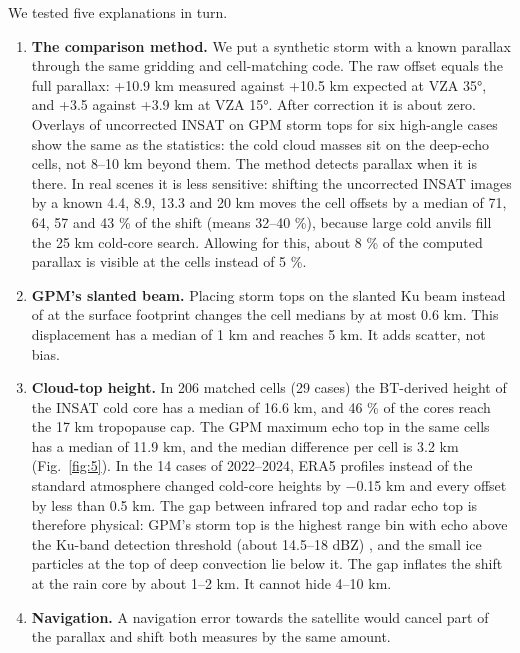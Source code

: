 We tested five explanations in turn.

\begin{enumerate}
\def\labelenumi{\arabic{enumi}.}
\item
  \textbf{The comparison method.} We put a synthetic storm with a known parallax through the same gridding and cell-matching code. The raw offset equals the full parallax: +10.9 km measured against +10.5 km expected at VZA 35°, and +3.5 against +3.9 km at VZA 15°. After correction it is about zero. Overlays of uncorrected INSAT on GPM storm tops for six high-angle cases show the same as the statistics: the cold cloud masses sit on the deep-echo cells, not 8--10 km beyond them. The method detects parallax when it is there. In real scenes it is less sensitive: shifting the uncorrected INSAT images by a known 4.4, 8.9, 13.3 and 20 km moves the cell offsets by a median of 71, 64, 57 and 43 \% of the shift (means 32--40 \%), because large cold anvils fill the 25 km cold-core search. Allowing for this, about 8 \% of the computed parallax is visible at the cells instead of 5 \%.
\item
  \textbf{GPM's slanted beam.} Placing storm tops on the slanted Ku beam instead of at the surface footprint changes the cell medians by at most 0.6 km. This displacement has a median of 1 km and reaches 5 km. It adds scatter, not bias.
\item
  \textbf{Cloud-top height.} In 206 matched cells (29 cases) the BT-derived height of the INSAT cold core has a median of 16.6 km, and 46 \% of the cores reach the 17 km tropopause cap. The GPM maximum echo top in the same cells has a median of 11.9 km, and the median difference per cell is 3.2 km (Fig.~\ref{fig:5}). In the 14 cases of 2022--2024, ERA5 profiles instead of the standard atmosphere changed cold-core heights by −0.15 km and every offset by less than 0.5 km. The gap between infrared top and radar echo top is therefore physical: GPM's storm top is the highest range bin with echo above the Ku-band detection threshold (about 14.5--18 dBZ) \citep{hou2014,toyoshima2015}, and the small ice particles at the top of deep convection lie below it. The gap inflates the shift at the rain core by about 1--2 km. It cannot hide 4--10 km.
\item
  \textbf{Navigation.} A navigation error towards the satellite would cancel part of the parallax and shift both measures by the same amount.


\end{enumerate}
